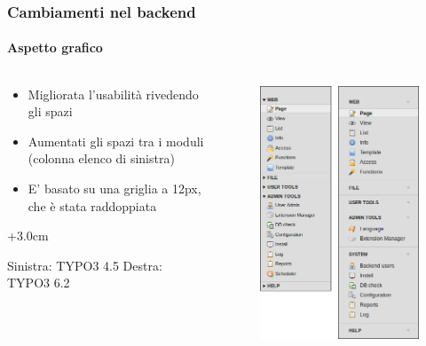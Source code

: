 
\begin{frame}[fragile]
	\frametitle{Cambiamenti nel backend}
	\framesubtitle{Aspetto grafico}

	\begin{columns}[T]

		\begin{column}{.5\textwidth}
			\begin{itemize}
				\item Migliorata l'usabilità rivedendo gli spazi
				\item Aumentati gli spazi tra i moduli (colonna elenco di sinistra)
				\item E' basato su una griglia a 12px, che è stata raddoppiata
			\end{itemize}

			\advance\leftskip+3.0cm

			\smaller
				Sinistra: TYPO3 4.5\newline
				Destra: TYPO3 6.2
			\normalsize
		\end{column}

		\begin{column}{.5\textwidth}
			\begin{figure}\vspace*{-0.4cm}
				\includegraphics[width=0.6\linewidth]{Images/BackendChanges/VisualAppearance.png}
			\end{figure}
		\end{column}

	\end{columns}

\end{frame}

